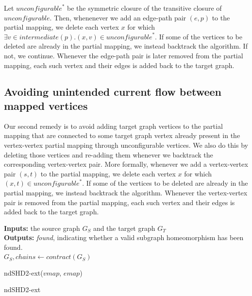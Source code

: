 \vspace{10pt}
Let $\mathit{unconfigurable}^*$ be the symmetric closure of the transitive closure of $\mathit{unconfigurable}$. Then, whenenever we add an edge-path pair $(e, p)$ to the partial mapping, we delete each vertex $x$ for which $\exists v \in \mathit{intermediate}(p) . (x, v) \in \mathit{unconfigurable}^*$. If some of the vertices to be deleted are already in the partial mapping, we instead backtrack the algorithm. If not, we continue.  Whenever the edge-path pair is later removed from the partial mapping, each such vertex and their edges is added back to the target graph.


\subsection{Avoiding unintended current flow between mapped vertices}
\label{sec:unintendedcurrent-vertex}
Our second remedy is to avoid adding target graph vertices to the partial mapping that are connected to some target graph vertex already present in the vertex-vertex partial mapping through unconfigurable vertices. We also do this by deleting those vertices and re-adding them whenever we backtrack the corresponding vertex-vertex pair. More formally, whenever we add a vertex-vertex pair $(s, t)$ to the partial mapping, we delete each vertex $x$ for which $(x, t) \in \mathit{unconfigurable}^*$. If some of the vertices to be deleted are already in the partial mapping, we instead backtrack the algorithm. Whenever the vertex-vertex pair is removed from the partial mapping, each such vertex and their edges is added back to the target graph.



\newenvironment{Algorithm}[2][tbh]%
{\begin{myalgo}[#1]
\centering
\begin{minipage}{#2}
\begin{algorithm}[H]}%
{\end{algorithm}
\end{minipage}
\end{myalgo}}


\begin{Algorithm}{20cm}
\SetAlgoLined
\LinesNumbered
\textbf{Inputs: } the source graph $G_S$ and the target graph $G_T$\\
\textbf{Outputs: } \textit{found}, indicating whether a valid subgraph homeomorphism has been found.\\
\color{purple}
 {
	$G_S, \mathit{chains} \longleftarrow \mathit{contract}(G_S)$ \color{black}\color{purple}
}
\color{black}

 \Return ndSHD2{\color{purple}-ext}($\mathit{vmap}$, $\mathit{emap}$)\tcp*[h]{\ref{algorithm:ndSHD2-ext}}\;
 \caption{ndSHD2-ext}
 \label{algorithm:ndSHD2-prune}
\end{Algorithm}

